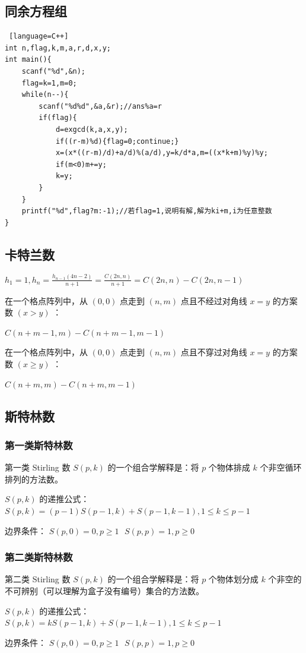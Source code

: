 \documentclass{article}
\begin{document}
\subsection{同余方程组}
\begin{lstlisting} [language=C++]
int n,flag,k,m,a,r,d,x,y;
int main(){
	scanf("%d",&n);
	flag=k=1,m=0;
	while(n--){
		scanf("%d%d",&a,&r);//ans%a=r
		if(flag){
			d=exgcd(k,a,x,y);
			if((r-m)%d){flag=0;continue;}
			x=(x*((r-m)/d)+a/d)%(a/d),y=k/d*a,m=((x*k+m)%y)%y;
			if(m<0)m+=y;
			k=y;
		}
	}
	printf("%d",flag?m:-1);//若flag=1,说明有解,解为ki+m,i为任意整数
}
\end{lstlisting}
\subsection{卡特兰数}
$h_1 = 1, h_n = \frac{h_{n-1}(4n-2)}{n+1} = \frac{C(2n, n)}{n+1} = C(2n, n) - C(2n, n-1)$ 

在一个格点阵列中，从 $(0, 0)$ 点走到 $(n, m)$ 点且不经过对角线 $x = y$ 的方案数 $(x > y)$ ： 

$C(n+m-1, m) - C(n+m-1, m-1)$ 

在一个格点阵列中，从 $(0, 0)$ 点走到 $(n, m)$ 点且不穿过对角线 $x = y$ 的方案数 $(x \geq y)$ ： 

 $C(n+m, m) - C(n+m, m-1)$ 
\subsection{斯特林数}
\subsubsection{第一类斯特林数}
第一类 Stirling 数 $S(p, k)$ 的一个组合学解释是：将 $p$ 个物体排成 $k$ 个非空循环排列的方法数。 

$S(p, k)$ 的递推公式： $S(p, k) = (p-1) S(p-1, k) + S(p-1, k-1), 1 \leq k \leq p-1$ 

边界条件： $S(p, 0) = 0, p \geq 1 \text{    } S(p, p) = 1, p \geq 0$
\subsubsection{第二类斯特林数}
第二类 Stirling 数 $S(p, k)$ 的一个组合学解释是：将 $p$ 个物体划分成 $k$ 个非空的不可辨别（可以理解为盒子没有编号）集合的方法数。

$S(p, k)$ 的递推公式： $S(p, k) = k S(p-1, k) + S(p-1, k-1), 1 \leq k \leq p-1$ 

边界条件： $S(p, 0) = 0, p \geq 1 \text{    } S(p, p) = 1, p \geq 0$
\end{document}
